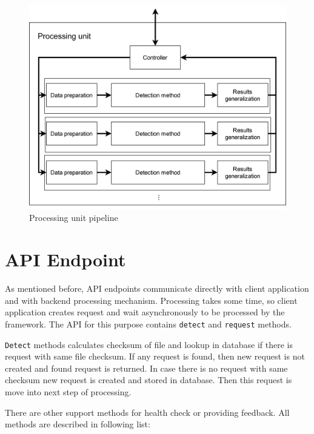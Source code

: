 \begin{figure}[H]
    \centering
    \includegraphics[width=.65\linewidth]{other-fig/framework_architecture_processing_unit.png}
    \caption{Processing unit pipeline}
    \label{fig:framework_architecture_processing_unit}
\end{figure}

\section{API Endpoint}

As mentioned before, API endpoints communicate directly with client application and with backend processing mechanism. Processing takes some time, so client application creates request and wait asynchronously to be processed by the framework. The API for this purpose contains \texttt{detect} and \texttt{request} methods.

\texttt{Detect} methods calculates checksum of file and lookup in database if there is request with same file checksum. If any request is found, then new request is not created and found request is returned. In case there is no request with same checksum new request is created and stored in database. Then this request is move into next step of processing. 

There are other support methods for health check or providing feedback. All methods are described in following list:

